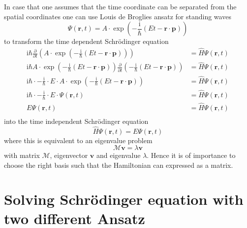 \documentclass[12pt]{scrartcl}
\begin{document}
In case that one assumes that the time coordinate can be separated from the spatial coordinates one can use Louis de Broglies ansatz for standing waves
\begin{equation}
\Psi(\mathbf{r},t)=A\cdot \exp(-\frac{\mathrm{i}}{\hbar}(Et-\mathbf{r}\cdot\mathbf{p}))
\label{ansatz:louisdebroglieswave}
\end{equation}
to transform the time dependent Schr\"odinger equation
\begin{align*}
\mathrm{i} \hbar \frac{\partial }{\partial t} (A\cdot \exp(-\frac{\mathrm{i}}{\hbar}(Et-\mathbf{r}\cdot\mathbf{p})) )&=\hat{H}\Psi(\mathbf{r},t)\\
\mathrm{i} \hbar  A\cdot \exp(-\frac{\mathrm{i}}{\hbar}(Et-\mathbf{r}\cdot\mathbf{p})) \frac{\partial }{\partial t}(-\frac{\mathrm{i}}{\hbar}(Et-\mathbf{r}\cdot\mathbf{p})) &=\hat{H}\Psi(\mathbf{r},t)\\
\mathrm{i} \hbar\cdot -\frac{\mathrm{i}}{\hbar} \cdot E \cdot A\cdot \exp(-\frac{\mathrm{i}}{\hbar}(Et-\mathbf{r}\cdot\mathbf{p}))  &=\hat{H}\Psi(\mathbf{r},t)\\
\mathrm{i} \hbar\cdot -\frac{\mathrm{i}}{\hbar} \cdot E \cdot \Psi(\mathbf{r},t)&=\hat{H}\Psi(\mathbf{r},t)\\
 E \Psi(\mathbf{r},t)&=\hat{H}\Psi(\mathbf{r},t)\\
\end{align*}
into the time independent Schr\"odinger equation
\begin{equation}
\hat{H}\Psi(\mathbf{r},t)=E \Psi(\mathbf{r},t)
\label{eq:tiseq}
\end{equation}
where this is equivalent to an eigenvalue problem
\begin{equation}
\mathcal{M} \mathbf{v} = \lambda \mathbf{v}
\label{eigenvalueproblem}
\end{equation}
with matrix $\mathcal{M}$, eigenvector $\mathbf{v}$ and eigenvalue $\lambda$. Hence it is of importance to choose the right basis such that the Hamiltonian can expressed as a matrix.

\section{Solving Schr\"odinger equation with two different Ansatz}
\end{document}
